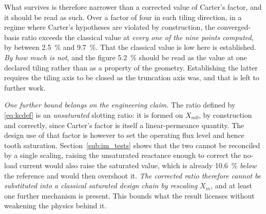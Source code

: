\documentclass[10pt,a4paper,twocolumn]{article}
\theoremstyle{plain}
\theoremstyle{remark}
\begin{document}
What survives is therefore narrower than a corrected value of Carter's
factor, and it should be read as such. Over a factor of four in each
tiling direction, in a regime where Carter's hypotheses are violated by
construction, the converged-basis ratio exceeds the classical value at
\emph{every one of the nine points computed}, by between
\SI{2.5}{\percent} and \SI{9.7}{\percent}. That the classical value is
low here is established. \emph{By how much is not}, and the figure
\SI{+5.2}{\percent} should be read as the value at one declared tiling
rather than as a property of the geometry. Establishing the latter
requires the tiling axis to be closed as the truncation axis was, and
that is left to further work.

\emph{One further bound belongs on the engineering claim.} The ratio
defined by \eqref{eq:kcdef} is an \emph{unsaturated} slotting ratio: it
is formed on $X_{m0}$, by construction and correctly, since Carter's
factor is itself a linear-permeance quantity. The design use of that
factor is however to set the operating flux level and hence tooth
saturation. Section~\ref{sub:im_tests} shows that the two cannot be
reconciled by a single scaling, raising the unsaturated reactance
enough to correct the no-load current would also raise the saturated
value, which is already \SI{10.6}{\percent} \emph{below} the reference
and would then overshoot it. \emph{The corrected ratio therefore cannot
be substituted into a classical saturated design chain by rescaling
$X_m$}, and at least one further mechanism is present. This bounds what
the result licenses without weakening the physics behind it.
\end{document}
